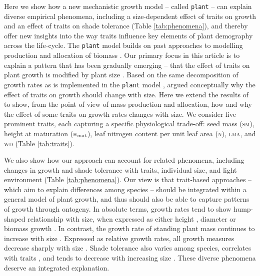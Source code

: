 \documentclass[9pt,twocolumn,twoside,lineno]{pnas-new}
\newcommand{\plant}{\texttt{plant}}
\newcommand{\lma}{\textsc{lma}}
\newcommand{\wood}{\textsc{wd}}
\newcommand{\seed}{\textsc{sm}}
\newcommand{\hmat}{\textsc{h}$_{\rm mat}$}
\newcommand{\nitrogen}{\textsc{n}}
\begin{document}
Here we show how a new mechanistic growth model -- called {\plant} \citep{Falster-2016} -- can explain diverse empirical phenomena, including a size-dependent effect of traits on growth and an effect of traits on shade tolerance (Table \ref{tab:phenomena}), and thereby offer new insights into the way traits influence key elements of plant demography across the life-cycle. The {\plant} model builds on past approaches to modelling production and allocation of biomass \citep[e.g.][]{Givnish-1988, Yokozawa-1995,Makela-1997, Moorcroft-2001, Sitch-2008, Falster-2011, King-2011, Gibert-2016}. Our primary focus in this article is to explain a pattern that has been gradually emerging -- that the effect of traits on plant growth is modified by plant size \citep{Ruger-2012, Iida-2014, Gibert-2016}. Based on the same decomposition of growth rates as is implemented in the {\plant} model \citep[from][]{Falster-2011, Falster-2017}, \citep{Gibert-2016} argued conceptually why the effect of traits on growth should change with size. Here we extend the results of \citep{Gibert-2016} to show, from the point of view of mass production and allocation, how and why the effect of some traits on growth rates changes with size. We consider five prominent traits, each capturing a specific physiological trade-off: seed mass ({\seed}), height at maturation ({\hmat}), leaf nitrogen content per unit leaf area ({\nitrogen}),  {\lma}, and {\wood} (Table \ref{tab:traits}).  

We also show how our approach can account for related phenomena, including changes in growth and shade tolerance with traits, individual size, and light environment (Table \ref{tab:phenomena}). Our view is that trait-based approaches -- which aim to explain differences among species -- should be integrated within a general model of plant growth, and thus should also be able to capture patterns of growth through ontogeny. In absolute terms, growth rates tend to show hump-shaped relationship with size, when expressed as either height \citep{Sillett-2010, King-2011}, diameter \citep{Canham-2004, Canham-2006, Herault-2011} or biomass growth \citep{Givnish-1988, Koch-2004}. In contrast, the growth rate of standing plant mass continues to increase with size \citep{Sillett-2010, Stephenson-2014}. Expressed as relative growth rates, all growth measures decrease sharply with size \citep{Rees-2010, Iida-2014}. Shade tolerance also varies among species, correlates with traits \citep{Messier-1999, Lusk-2008, Poorter-2006}, and tends to decrease with increasing size \citep{Givnish-1988, Kneeshaw-2006, Lusk-2008}. These diverse phenomena deserve an integrated explanation.
\end{document}
